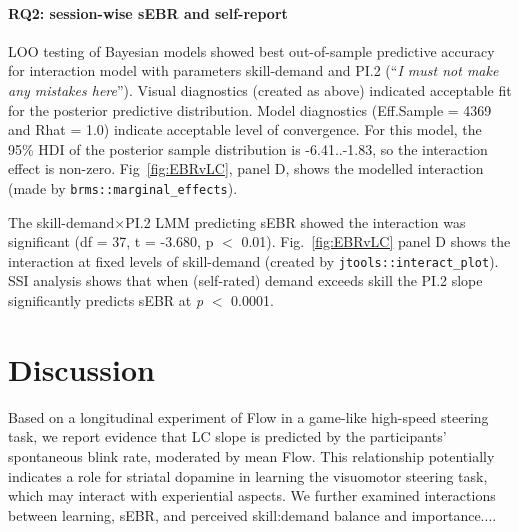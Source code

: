 \documentclass[10pt,letterpaper,floatsintext]{article}
\begin{document}
\paragraph{RQ2: session-wise sEBR and self-report}
LOO testing of Bayesian models showed best out-of-sample predictive accuracy for interaction model with parameters skill-demand and PI.2 (``\textit{I must not make any mistakes here}''). 
Visual diagnostics (created as above) indicated acceptable fit for the posterior predictive distribution. Model diagnostics (Eff.Sample = 4369 and Rhat = 1.0) indicate acceptable level of convergence. For this model, the 95\% HDI of the posterior sample distribution is -6.41..-1.83, so the interaction effect is non-zero. Fig~\ref{fig:EBRvLC}, panel D, shows the modelled interaction (made by \verb|brms::marginal_effects|).

The skill-demand$\times$PI.2 LMM predicting sEBR showed the interaction was significant (df = 37, t = -3.680, p $<$ 0.01). %
Fig.~\ref{fig:EBRvLC} panel D shows the interaction at fixed levels of skill-demand (created by \verb|jtools::interact_plot|). SSI analysis shows that when (self-rated) demand exceeds skill the PI.2 slope significantly predicts sEBR at {\it p} $<$ 0.0001. %


\section{Discussion}
Based on a longitudinal experiment of Flow in a game-like high-speed steering task, we report evidence that LC slope is predicted by the participants' spontaneous blink rate, moderated by mean Flow. This relationship potentially indicates a role for striatal dopamine in learning the visuomotor steering task, which may interact with experiential aspects. We further examined interactions between learning, sEBR, and perceived skill:demand balance and importance....%

\end{document}
